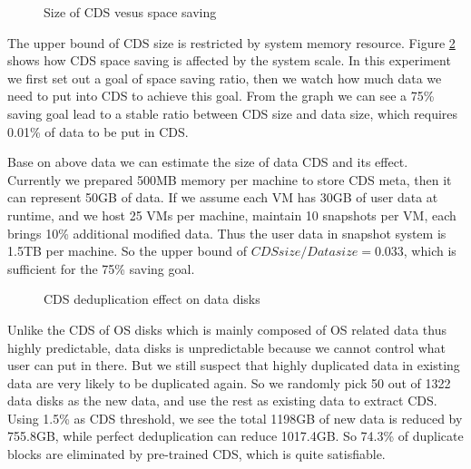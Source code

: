 \begin{figure}
  \centering
  \caption{Size of CDS vesus space saving}
  \label{fig:datacdssize}
\end{figure}

The upper bound of CDS size is restricted by system memory resource.
Figure \ref{fig:datacds} shows how CDS space saving is affected by the system scale. 
In this experiment we first set out a goal of space saving ratio, 
then we watch how much data we need to put into CDS to achieve this goal.
From the graph we can see a 75\% saving goal lead to a stable ratio between 
CDS size and data size, which requires 0.01\% of data to be put in CDS.

Base on above data we can estimate the size of data CDS and its effect. 
Currently we prepared 500MB memory per machine to store CDS meta, then it can represent 50GB of data. 
If we assume each VM has 30GB of user data at runtime, and we host 25 VMs per machine, 
 maintain 10 snapshots per VM, each brings 10\% additional modified data. 
Thus the user data in snapshot system is 1.5TB per machine. So the upper bound of 
$CDS size/ Data size = 0.033$, which is sufficient for the 75\% saving goal.

\begin{figure}
  \centering
  \caption{CDS deduplication effect on data disks}
  \label{fig:datacds}
\end{figure}

Unlike the CDS of OS disks which is mainly composed of OS related data thus highly predictable, 
data disks is unpredictable because we cannot control what user can put in there. But we still
suspect that highly duplicated data in existing data are very likely to be duplicated again.
So we randomly pick 50 out of 1322 data disks as the new data, and use the rest as existing data
to extract CDS. Using 1.5\% as CDS threshold, we see the total 1198GB of new data is reduced by 
755.8GB, while perfect deduplication can reduce 1017.4GB. So 74.3\% of duplicate blocks are eliminated 
by pre-trained CDS, which is quite satisfiable.
